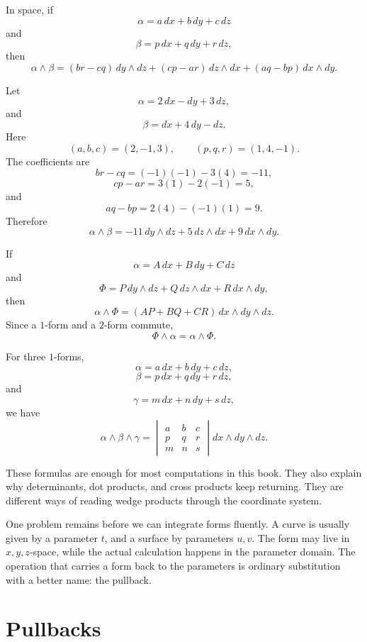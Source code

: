 In space, if
\[
    \alpha=a\,dx+b\,dy+c\,dz
\]
and
\[
    \beta=p\,dx+q\,dy+r\,dz,
\]
then
\[
\boxed{
    \alpha\wedge\beta
    =
    (br-cq)\,dy\wedge dz
    +
    (cp-ar)\,dz\wedge dx
    +
    (aq-bp)\,dx\wedge dy.
}
\]

\begin{example}
Let
\[
    \alpha=2\,dx-dy+3\,dz,
\]
and
\[
    \beta=dx+4\,dy-dz.
\]
Here
\[
    (a,b,c)=(2,-1,3),
    \qquad
    (p,q,r)=(1,4,-1).
\]
The coefficients are
\[
    br-cq=(-1)(-1)-3(4)=-11,
\]
\[
    cp-ar=3(1)-2(-1)=5,
\]
and
\[
    aq-bp=2(4)-(-1)(1)=9.
\]
Therefore
\[
\boxed{
    \alpha\wedge\beta
    =
    -11\,dy\wedge dz
    +
    5\,dz\wedge dx
    +
    9\,dx\wedge dy.
}
\]
\end{example}

If
\[
    \alpha=A\,dx+B\,dy+C\,dz
\]
and
\[
    \Phi=P\,dy\wedge dz+Q\,dz\wedge dx+R\,dx\wedge dy,
\]
then
\[
\boxed{
    \alpha\wedge\Phi
    =
    (AP+BQ+CR)\,dx\wedge dy\wedge dz.
}
\]
Since a \(1\)-form and a \(2\)-form commute,
\[
\boxed{
    \Phi\wedge\alpha
    =
    \alpha\wedge\Phi.
}
\]

For three \(1\)-forms,
\[
    \alpha=a\,dx+b\,dy+c\,dz,
\]
\[
    \beta=p\,dx+q\,dy+r\,dz,
\]
and
\[
    \gamma=m\,dx+n\,dy+s\,dz,
\]
we have
\[
\boxed{
    \alpha\wedge\beta\wedge\gamma
    =
    \begin{vmatrix}
        a&b&c\\
        p&q&r\\
        m&n&s
    \end{vmatrix}
    dx\wedge dy\wedge dz.
}
\]

These formulas are enough for most computations in this book.  They also explain why
determinants, dot products, and cross products keep returning.  They are different
ways of reading wedge products through the coordinate system.

One problem remains before we can integrate forms fluently.  A curve is usually given
by a parameter \(t\), and a surface by parameters \(u,v\).  The form may live in
\(x,y,z\)-space, while the actual calculation happens in the parameter domain.  The
operation that carries a form back to the parameters is ordinary substitution with a
better name: the pullback.

\section{Pullbacks}
\label{sec:16.5}

